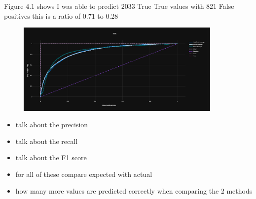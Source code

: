 Figure 4.1 shows I was able to predict 2033 True True values with 821 False positives this is a ratio of 0.71 to 0.28

\begin{figure}[hbt!]
 \includegraphics[width=10cm]{figures/azure_ml_roc.png}
 \caption{}
\end{figure}

\begin{itemize}
\item talk about the precision
\item talk about the recall 
\item talk about the F1 score
\item for all of these compare expected with actual
\item how many more values are predicted correctly when comparing the 2 methods
\end{itemize}
